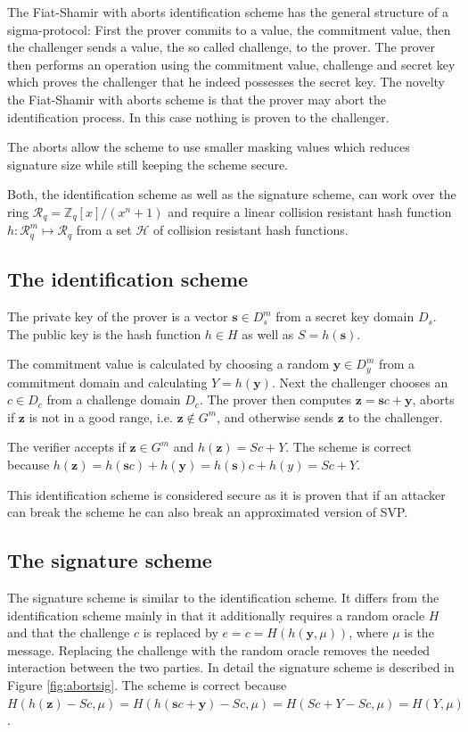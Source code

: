 The Fiat-Shamir with aborts identification scheme has the general structure of a sigma-protocol: First the prover commits to a value, the commitment value, then the challenger sends a value, the so called challenge, to the prover. The prover then performs an operation using the commitment value, challenge and secret key which proves the challenger that he indeed possesses the secret key. The novelty the Fiat-Shamir with aborts scheme is that the prover may abort the identification process. In this case nothing is proven to the challenger.

The aborts allow the scheme to use smaller masking values which reduces signature size while still keeping the scheme secure.

Both, the identification scheme as well as the signature scheme, can work over the ring $\mathcal{R}_q = \mathds{Z}_q[x] / (x^n + 1)$ and require a linear collision resistant hash function $h: \mathcal{R}_q^m \mapsto \mathcal{R}_q$ from a set $\mathcal{H}$ of collision resistant hash functions.

\subsection{The identification scheme}
The private key of the prover is a vector $\bm{s} \in D_s^m$ from a secret key domain $D_s$.
The public key is the hash function $h \in H$ as well as $S = h(\bm{s})$.

The commitment value is calculated by choosing a random $\bm{y} \in D_y^m$ from a commitment domain and calculating $Y = h(\bm{y})$.
Next the challenger chooses an $c \in D_c$ from a challenge domain $D_c$. The prover then computes $\bm{z} = \bm{s}c + \bm{y}$, aborts if $\bm{z}$ is not in a good range, i.e. $\bm{z} \notin G^m$, and otherwise sends $\bm{z}$ to the challenger.

The verifier accepts if $\bm{z} \in G^m$ and $h(\bm{z}) = Sc+Y$. The scheme is correct because $h(\bm{z})= h(\bm{s} c) + h(\bm{y}) = h(\bm{s}) c + h(y) =Sc+Y$.

This identification scheme is considered secure as it is proven that if an attacker can break the scheme he can also break an approximated version of SVP.

\subsection{The signature scheme}
The signature scheme is similar to the identification scheme. It differs from the identification scheme mainly in that it additionally requires a random oracle $H$ and that the challenge $c$ is replaced by $e = c = H(h(\bm{y},\mu))$, where $μ$ is the message. Replacing the challenge with the random oracle removes the needed interaction between the two parties. In detail the signature scheme is described in Figure \ref{fig:abortsig}. The scheme is correct because $H(h(\bm{z}) - Sc, \mu) = H(h(\bm{s} c + \bm{y}) - Sc, \mu) = H(S c + Y - Sc, \mu) = H(Y, \mu)$.

